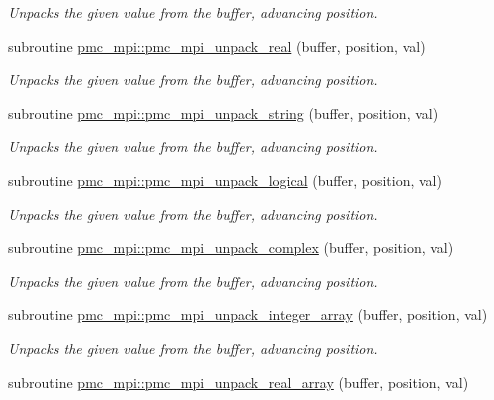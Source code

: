 \begin{DoxyCompactItemize}
\begin{DoxyCompactList}\small\item\em Unpacks the given value from the buffer, advancing position. \end{DoxyCompactList}\item 
subroutine \mbox{\hyperlink{namespacepmc__mpi_ab35288d7d6b96560d20b4279fe3d5d24}{pmc\+\_\+mpi\+::pmc\+\_\+mpi\+\_\+unpack\+\_\+real}} (buffer, position, val)
\begin{DoxyCompactList}\small\item\em Unpacks the given value from the buffer, advancing position. \end{DoxyCompactList}\item 
subroutine \mbox{\hyperlink{namespacepmc__mpi_a9f7e3c5b0f7f68b520e13d980c9ad29c}{pmc\+\_\+mpi\+::pmc\+\_\+mpi\+\_\+unpack\+\_\+string}} (buffer, position, val)
\begin{DoxyCompactList}\small\item\em Unpacks the given value from the buffer, advancing position. \end{DoxyCompactList}\item 
subroutine \mbox{\hyperlink{namespacepmc__mpi_a888a1c5675835da110e153fbacebb415}{pmc\+\_\+mpi\+::pmc\+\_\+mpi\+\_\+unpack\+\_\+logical}} (buffer, position, val)
\begin{DoxyCompactList}\small\item\em Unpacks the given value from the buffer, advancing position. \end{DoxyCompactList}\item 
subroutine \mbox{\hyperlink{namespacepmc__mpi_adf7ed9374c30934fce2f30add1b2f703}{pmc\+\_\+mpi\+::pmc\+\_\+mpi\+\_\+unpack\+\_\+complex}} (buffer, position, val)
\begin{DoxyCompactList}\small\item\em Unpacks the given value from the buffer, advancing position. \end{DoxyCompactList}\item 
subroutine \mbox{\hyperlink{namespacepmc__mpi_ad83634463577bdcc4454e393c77e5b04}{pmc\+\_\+mpi\+::pmc\+\_\+mpi\+\_\+unpack\+\_\+integer\+\_\+array}} (buffer, position, val)
\begin{DoxyCompactList}\small\item\em Unpacks the given value from the buffer, advancing position. \end{DoxyCompactList}\item 
subroutine \mbox{\hyperlink{namespacepmc__mpi_a74007afa0767105d3817670040bb9641}{pmc\+\_\+mpi\+::pmc\+\_\+mpi\+\_\+unpack\+\_\+real\+\_\+array}} (buffer, position, val)

\end{DoxyCompactItemize}
